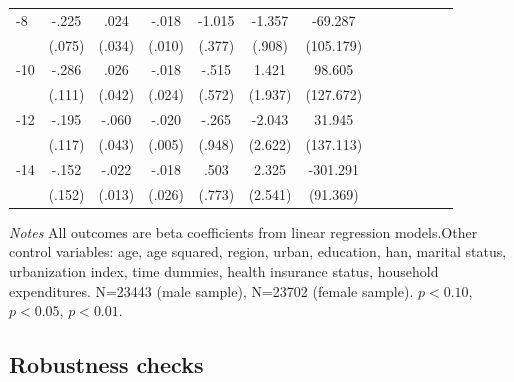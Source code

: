 \begin{table}[p]
\begin{adjustbox}{max width=\linewidth}
\begin{threeparttable}
{\begin{tabular}{l*{6}{S S}}
-8             &    -.225\sym{***}&     .024         &    -.018\sym{*}  &   -1.015\sym{***}&   -1.357         &  -69.287         \\
                &   (.075)         &   (.034)         &   (.010)         &   (.377)         &   (.908)         &(105.179)         \\
-10            &    -.286\sym{**} &     .026         &    -.018         &    -.515         &    1.421         &   98.605         \\
                &   (.111)         &   (.042)         &   (.024)         &   (.572)         &  (1.937)         &(127.672)         \\
-12           &    -.195\sym{*}  &    -.060         &    -.020\sym{***}&    -.265         &   -2.043         &   31.945         \\
                &   (.117)         &   (.043)         &   (.005)         &   (.948)         &  (2.622)         &(137.113)         \\
-14           &    -.152         &    -.022\sym{*}  &    -.018         &     .503         &    2.325         & -301.291\sym{***}\\
                &   (.152)         &   (.013)         &   (.026)         &   (.773)         &  (2.541)         & (91.369)         \\   
\bottomrule
\end{tabular}
\begin{tablenotes}
\item \footnotesize \textit{Notes} All outcomes are beta coefficients from linear regression models.Other control variables: age, age squared, region, urban, education, han, marital status, urbanization index, time dummies, health insurance status, household expenditures. N=23443 (male sample), N=23702 (female sample). \sym{*} \(p<0.10\), \sym{**} \(p<0.05\), \sym{***} \(p<0.01\).
\end{tablenotes}
}
\end{threeparttable}
\end{adjustbox}
\end{table}

\clearpage
\subsection*{Robustness checks}

